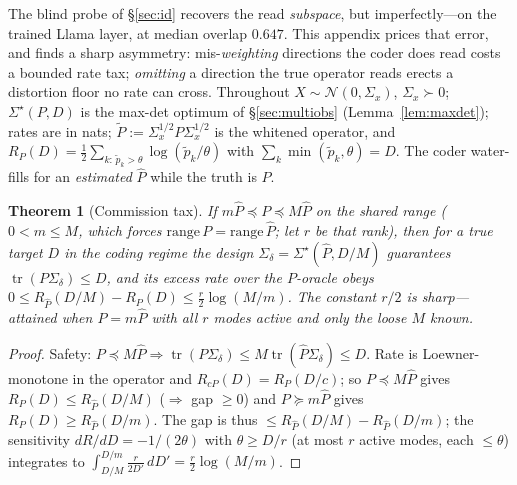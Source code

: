 \documentclass[lettersize,onecolumn]{IEEEtran}
\newtheorem{theorem}{Theorem}
\theoremstyle{definition}
\theoremstyle{remark}
\newcommand{\tr}{\operatorname{tr}}
\begin{document}
The blind probe of \S\ref{sec:id} recovers the read \emph{subspace}, but imperfectly---on
the trained Llama layer, at median overlap $0.647$. This appendix prices that error, and
finds a sharp asymmetry: mis-\emph{weighting} directions the coder does read costs a
bounded rate tax; \emph{omitting} a direction the true operator reads erects a distortion
floor no rate can cross. Throughout $X\sim\mathcal N(0,\Sigma_x)$, $\Sigma_x\succ0$;
$\Sigma^\star(P,D)$ is the max-det optimum of \S\ref{sec:multiobs}
(Lemma~\ref{lem:maxdet}); rates are in nats; $\tilde P:=\Sigma_x^{1/2}P\Sigma_x^{1/2}$ is
the whitened operator, and $R_P(D)=\tfrac12\sum_{k:\,\tilde p_k>\theta}\log(\tilde
p_k/\theta)$ with $\sum_k\min(\tilde p_k,\theta)=D$. The coder water-fills for an
\emph{estimated} $\hat P$ while the truth is $P$.

\begin{theorem}[Commission tax]\label{thm:commission}
If $m\hat P\preceq P\preceq M\hat P$ on the shared range ($0<m\le M$, which forces
$\mathrm{range}\,P=\mathrm{range}\,\hat P$; let $r$ be that rank), then for a true target
$D$ in the coding regime the design $\Sigma_\delta=\Sigma^\star(\hat P,D/M)$ guarantees
$\tr(P\Sigma_\delta)\le D$, and its excess rate over the $P$-oracle obeys $0\le R_{\hat
P}(D/M)-R_P(D)\le\tfrac r2\log(M/m)$. The constant $r/2$ is sharp---attained when
$P=m\hat P$ with all $r$ modes active and only the loose $M$ known.
\end{theorem}
\begin{proof}
Safety: $P\preceq M\hat P\Rightarrow\tr(P\Sigma_\delta)\le M\tr(\hat P\Sigma_\delta)\le D$.
Rate is Loewner-monotone in the operator and $R_{cP}(D)=R_P(D/c)$; so $P\preceq M\hat P$
gives $R_P(D)\le R_{\hat P}(D/M)$ ($\Rightarrow$ gap $\ge0$) and $P\succeq m\hat P$ gives
$R_P(D)\ge R_{\hat P}(D/m)$. The gap is thus $\le R_{\hat P}(D/M)-R_{\hat P}(D/m)$; the
sensitivity $dR/dD=-1/(2\theta)$ with $\theta\ge D/r$ (at most $r$ active modes, each
$\le\theta$) integrates to $\int_{D/M}^{D/m}\tfrac{r}{2D'}\,dD'=\tfrac r2\log(M/m)$.
\end{proof}
\end{document}
